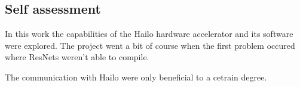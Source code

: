 \subsection*{Self assessment}
In this work the capabilities of the Hailo hardware accelerator and its software were explored.
The project went a bit of course when the first problem occured where ResNets weren't able to compile.

The communication with Hailo were only beneficial to a cetrain degree.
